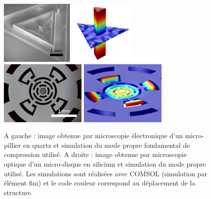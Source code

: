 \documentclass[12pt,a4paper]{article}
\begin{document}
\begin{figure}
\center
\includegraphics[height=90pt]{figures/micropillar.png}
\includegraphics[height=90pt]{figures/micropillar_disp.png}
\includegraphics[height=90pt]{figures/microwheel.png}
\includegraphics[height=90pt]{figures/microwheel_disp.png}
\caption{A gauche : image obtenue par microscopie électronique d'un micro-pillier en quartz et simulation du mode propre fondamental de compression utilisé.
A droite : image obtenue par microscopie optique d'un micro-disque en silicium et simulation du mode propre utilisé.
Les simulations sont réalisées avec COMSOL (simulation par élément fini) et le code couleur correspond au déplacement de la structure.}
\label{fig:resonators}
\end{figure}
\end{document}
